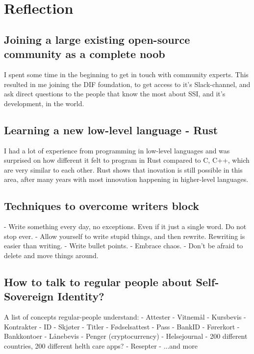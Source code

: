 \chapter{Reflection}

\section{Joining a large existing open-source community as a complete noob}

I spent some time in the beginning to get in touch with community experts. This resulted in me joining the DIF foundation, to get access to it's Slack-channel, and ask direct questions to the people that know the most about SSI, and it's development, in the world.

\section{Learning a new low-level language - Rust}

I had a lot of experience from programming in low-level languages and was surprised on how different it felt to program in Rust compared to C, C++, which are very similar to each other. Rust shows that inovation is still possible in this area, after many years with most innovation happening in higher-level languages.

\section{Techniques to overcome writers block}

- Write something every day, no exceptions. Even if it just a single word. Do not stop ever.
- Allow yourself to write stupid things, and then rewrite. Rewriting is easier than writing.
- Write bullet points.
- Embrace chaos.
- Don't be afraid to delete and move things around.

\section{How to talk to regular people about Self-Sovereign Identity?}

A list of concepts regular-people understand:
- Attester
- Vitnemål
- Kursbevis
- Kontrakter
- ID
- Skjøter
- Titler
- Fødselsattest
- Pass
- BankID
- Førerkort
- Bankkontoer
- Lånebevis
- Penger (cryptocurrency)
- Helsejournal - 200 different countries, 200 different helth care apps?
- Resepter
- ...and more

